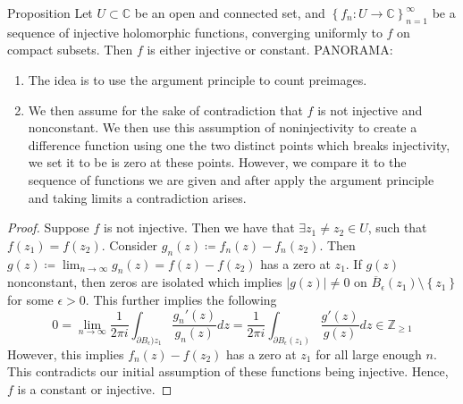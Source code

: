 \documentclass{article}
\begin{document}
\begin{misc}{Proposition}{}
Let \( U \subset \mathbb{C}  \) be an open and connected set, and \( \left\{ f_{n} :U\to \mathbb{C}  \right\}_{n = 1}^{\infty}   \) be a sequence of injective holomorphic functions, converging uniformly to \( f\) on compact subsets. Then \( f \) is either injective or constant.
\tcbline
PANORAMA:
\begin{enumerate}[]
    \item The idea is to use the argument principle to count preimages. 
    \item We then assume for the sake of contradiction that \( f \)  is not injective and nonconstant. We then use this assumption of noninjectivity to create a difference function using one the two distinct points which breaks injectivity, we set it to be is zero at these points. However, we compare it to the sequence of functions we are given and after apply the argument principle and taking limits a contradiction arises. 
\end{enumerate}

\quad

\begin{proof}

    Suppose \( f \) is not injective. Then we have that \( \exists z_1 \neq z_2 \in U \), such that \( f(z_1) = f(z_2) \). Consider \( g_{n} (z)\coloneqq f_{n} (z) - f_{n} (z_2) \). Then \( g(z) \coloneqq \lim_{n \to \infty} g_{n} (z) = f(z )- f(z_2) \) has a zero at \( z_1 \). If \( g(z) \)  nonconstant, then zeros are isolated which implies \( |g(z)|\neq 0 \)  on \( \overline{B} _\epsilon (z_1) \setminus \left\{ z_1 \right\}  \) for some \( \epsilon >0 \). This further implies the following 
    \[
       0 = \lim_{n \to \infty} \frac{1}{2\pi i} \int _{\partial B_{\epsilon })z_1 }\frac{g_{n} '(z)}{g_{n} (z)}dz =   \frac{1}{2\pi i}\int _{\partial B_{\epsilon }(z_1) }\frac{g'(z)}{g(z)} dz \in \mathbb{Z} _{\geq 1}
    \]
    However, this implies \( f_{n} (z) - f(z_2) \) has a zero at \( z_1 \) for all large enough \( n \). This contradicts our initial assumption of these functions being injective. Hence, \( f \) is a constant or injective. 
\end{proof}

\end{misc}
\end{document}
